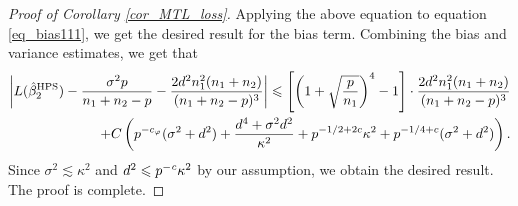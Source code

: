 \begin{proof}[Proof of Corollary \ref{cor_MTL_loss}]
Applying the above equation to equation \eqref{eq_bias111}, we get the desired result for the bias term.
Combining the bias and variance estimates, we get that
\begin{align*}
	\left|L(\hat{\beta}_2^{\textup{HPS}})  - \frac{\sigma^2 p}{n_1+n_2-p} -  \frac{2d^2 n_1^2 (n_1+n_2)}{(n_1 + n_2 - p)^3}\right| \leqslant   \left[\left( 1+\sqrt{\frac{p}{n_1}}\right)^4-1\right] \cdot \frac{2d^2n_1^2 (n_1+n_2)}{(n_1 + n_2 - p)^3} \nonumber\\
+C\left( p^{-c_\varphi} (\sigma^2 + d^2)+ \frac{d^4 + \sigma^2 d^2}{\kappa^2}+p^{-1/2+2c}\kappa^2 +  p^{-1/4+c} (\sigma^2 +d^2) \right).
\end{align*}
Since $\sigma^2 \lesssim  \kappa^2$ and $d^2 \leqslant p^{-{\mathit{c}}}{\kappa^2}$ by our assumption, we obtain the desired result.
The proof is complete.
\end{proof}
